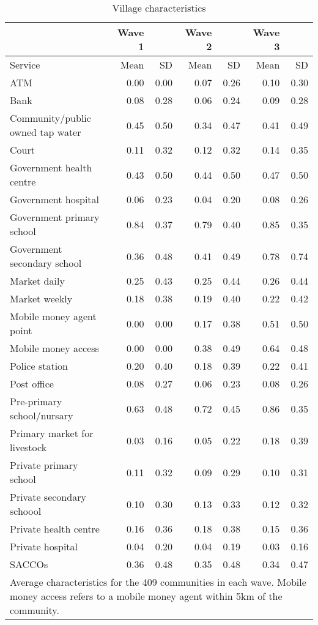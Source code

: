 \begin{table}[htbp] 
  \centering
  \caption{Village characteristics} \label{village sum}
    \begin{tabular}{lrrrrrr}
    \toprule
          & Wave 1 &       & Wave 2 &       & Wave 3 &  \\
    \midrule
     Service     & Mean  &  SD   & Mean  &  SD   & Mean  &  SD  \\
  
    ATM   & 0.00  & 0.00  & 0.07  & 0.26  & 0.10  & 0.30 \\
    Bank  & 0.08  & 0.28  & 0.06  & 0.24  & 0.09  & 0.28 \\
    Community/public owned tap water & 0.45  & 0.50  & 0.34  & 0.47  & 0.41  & 0.49 \\
    Court & 0.11  & 0.32  & 0.12  & 0.32  & 0.14  & 0.35 \\
    Government health centre & 0.43  & 0.50  & 0.44  & 0.50  & 0.47  & 0.50 \\
    Government hospital & 0.06  & 0.23  & 0.04  & 0.20  & 0.08  & 0.26 \\
    Government primary school & 0.84  & 0.37  & 0.79  & 0.40  & 0.85  & 0.35 \\
    Government secondary school & 0.36  & 0.48  & 0.41  & 0.49  & 0.78  & 0.74 \\
    Market daily & 0.25  & 0.43  & 0.25  & 0.44  & 0.26  & 0.44 \\
    Market weekly & 0.18  & 0.38  & 0.19  & 0.40  & 0.22  & 0.42 \\
    Mobile money agent point & 0.00  & 0.00  & 0.17  & 0.38  & 0.51  & 0.50 \\
    Mobile money access  & 0.00  & 0.00  & 0.38  & 0.49  & 0.64  & 0.48 \\
    Police station & 0.20  & 0.40  & 0.18  & 0.39  & 0.22  & 0.41 \\
    Post office & 0.08  & 0.27  & 0.06  & 0.23  & 0.08  & 0.26 \\
    Pre-primary school/nursary & 0.63  & 0.48  & 0.72  & 0.45  & 0.86  & 0.35 \\
    Primary market for livestock & 0.03  & 0.16  & 0.05  & 0.22  & 0.18  & 0.39 \\
    Private primary school & 0.11  & 0.32  & 0.09  & 0.29  & 0.10  & 0.31 \\
    Private secondary schoool & 0.10  & 0.30  & 0.13  & 0.33  & 0.12  & 0.32 \\
    Private health centre & 0.16  & 0.36  & 0.18  & 0.38  & 0.15  & 0.36 \\
    Private hospital & 0.04  & 0.20  & 0.04  & 0.19  & 0.03  & 0.16 \\
    SACCOs & 0.36  & 0.48  & 0.35  & 0.48  & 0.34  & 0.47 \\
    \bottomrule
    \multicolumn{7}{p{13cm}}{Average characteristics for the 409 communities in each wave. Mobile money access refers to a mobile money agent within 5km of the community.}
    \end{tabular}%
  \label{tab:addlabel}%
\end{table}%
